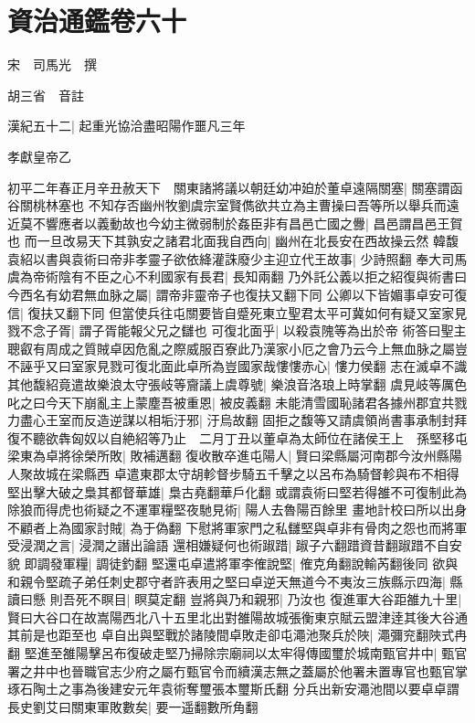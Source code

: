 \section{資治通鑑卷六十}
宋　司馬光　撰

胡三省　音註

漢紀五十二|{
	起重光協洽盡昭陽作噩凡三年}


孝獻皇帝乙

初平二年春正月辛丑赦天下　關東諸將議以朝廷幼冲廹於董卓遠隔關塞|{
	關塞謂函谷關桃林塞也}
不知存否幽州牧劉虞宗室賢儁欲共立為主曹操曰吾等所以舉兵而遠近莫不響應者以義動故也今幼主微弱制於姦臣非有昌邑亡國之釁|{
	昌邑謂昌邑王賀也}
而一旦改易天下其孰安之諸君北面我自西向|{
	幽州在北長安在西故操云然}
韓馥袁紹以書與袁術曰帝非孝靈子欲依絳灌誅廢少主迎立代王故事|{
	少詩照翻}
奉大司馬虞為帝術陰有不臣之心不利國家有長君|{
	長知兩翻}
乃外託公義以拒之紹復與術書曰今西名有幼君無血脉之屬|{
	謂帝非靈帝子也復扶又翻下同}
公卿以下皆媚事卓安可復信|{
	復扶又翻下同}
但當使兵往屯關要皆自蹙死東立聖君太平可冀如何有疑又室家見戮不念子胥|{
	謂子胥能報父兄之讎也}
可復北面乎|{
	以殺袁隗等為出於帝}
術答曰聖主聰叡有周成之質賊卓因危亂之際威服百寮此乃漢家小厄之會乃云今上無血脉之屬豈不誣乎又曰室家見戮可復北面此卓所為豈國家哉慺慺赤心|{
	慺力侯翻}
志在滅卓不識其他馥紹竟遣故樂浪太守張岐等齎議上虞尊號|{
	樂浪音洛琅上時掌翻}
虞見岐等厲色叱之曰今天下崩亂主上蒙塵吾被重恩|{
	被皮義翻}
未能清雪國恥諸君各據州郡宜共戮力盡心王室而反造逆謀以相垢汙邪|{
	汙烏故翻}
固拒之馥等又請虞領尚書事承制封拜復不聽欲犇匈奴以自絶紹等乃止　二月丁丑以董卓為太師位在諸侯王上　孫堅移屯梁東為卓將徐榮所敗|{
	敗補邁翻}
復收散卒進屯陽人|{
	賢曰梁縣屬河南郡今汝州縣陽人聚故城在梁縣西}
卓遣東郡太守胡軫督步騎五千擊之以呂布為騎督軫與布不相得堅出擊大破之梟其都督華雄|{
	梟古堯翻華戶化翻}
或謂袁術曰堅若得雒不可復制此為除狼而得虎也術疑之不運軍糧堅夜馳見術|{
	陽人去魯陽百餘里}
畫地計校曰所以出身不顧者上為國家討賊|{
	為于偽翻}
下慰將軍家門之私讎堅與卓非有骨肉之怨也而將軍受浸潤之言|{
	浸潤之譖出論語}
還相嫌疑何也術踧踖|{
	踧子六翻踖資昔翻踧踖不自安貌}
即調發軍糧|{
	調徒釣翻}
堅還屯卓遣將軍李傕說堅|{
	傕克角翻說輸芮翻後同}
欲與和親令堅疏子弟任刺史郡守者許表用之堅曰卓逆天無道今不夷汝三族縣示四海|{
	縣讀曰懸}
則吾死不瞑目|{
	瞑莫定翻}
豈將與乃和親邪|{
	乃汝也}
復進軍大谷距雒九十里|{
	賢曰大谷口在故嵩陽西北八十五里北出對雒陽故城張衡東京賦云盟津逹其後大谷通其前是也距至也}
卓自出與堅戰於諸陵間卓敗走卻屯澠池聚兵於陜|{
	澠彌兖翻陜式冉翻}
堅進至雒陽擊呂布復破走堅乃掃除宗廟祠以太牢得傳國璽於城南甄官井中|{
	甄官署之井中也晉職官志少府之屬冇甄官令而續漢志無之蓋屬於他署未置專官也甄官掌琢石陶土之事為後建安元年袁術奪璽張本璽斯氏翻}
分兵出新安澠池間以要卓卓謂長史劉艾曰關東軍敗數矣|{
	要一遥翻數所角翻}
